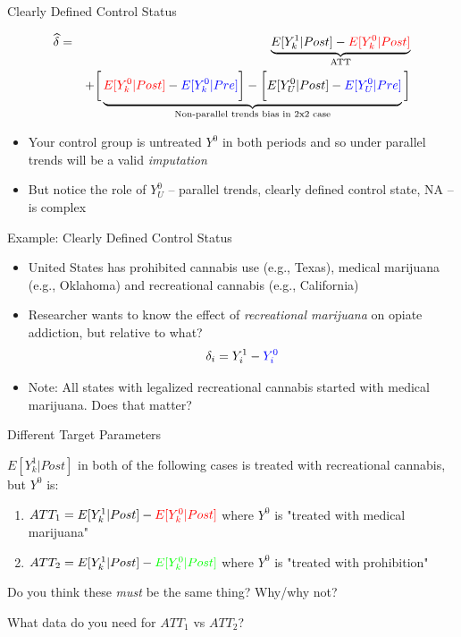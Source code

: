 \documentclass{beamer}
\begin{document}
\begin{frame}{Clearly Defined Control Status}

\begin{eqnarray*}
\widehat{\delta} &=& \underbrace{E[Y^1_k | Post] - \textcolor{red}{E[Y^0_k | Post]}}_{\mathclap{\text{ATT}}} \\
&& + \bigg [  \underbrace{\textcolor{red}{E[Y^0_k | Post]} - \textcolor{blue}{E[Y^0_k | Pre]} \bigg ] - \bigg [ E[Y^0_U | Post] - \textcolor{blue}{E[Y_U^0 | Pre]} }_{\mathclap{\text{Non-parallel trends bias in 2x2 case}}} \bigg ]
\end{eqnarray*}

\begin{itemize}
\item Your control group is untreated $Y^0$ in both periods and so under parallel trends will be a valid \emph{imputation}
\item But notice the role of $Y^0_U$ -- parallel trends, clearly defined control state, NA -- is complex
\end{itemize}
\end{frame}



\begin{frame}{Example: Clearly Defined Control Status}

\begin{itemize}
\item United States has prohibited cannabis use (e.g., Texas), medical marijuana (e.g., Oklahoma) and recreational cannabis (e.g., California)
\item Researcher wants to know the effect of \emph{recreational marijuana} on opiate addiction, but relative to what?  $$\delta_i = Y^1_i - \textcolor{blue}{Y^0_i}$$
\item Note: All states with legalized recreational cannabis started with medical marijuana.  Does that matter?

\end{itemize}

\end{frame}

\begin{frame}{Different Target Parameters}

$E[Y^1_k|Post]$ in both of the following cases is treated with recreational cannabis, but $Y^0$ is:

\begin{enumerate}
\item $ATT_1 = E[Y^1_k|Post] - \textcolor{red}{E[Y^0_k|Post]}$ where $Y^0$ is "treated with medical marijuana"
\item $ATT_2 = E[Y^1_k|Post] - \textcolor{green}{E[Y^0_k|Post]}$ where $Y^0$ is "treated with prohibition"
\end{enumerate}

\bigskip

\bigskip

Do you think these \emph{must} be the same thing?  Why/why not? 

\bigskip

What data do you need for $ATT_1$ vs $ATT_2$?

\end{frame}
\end{document}
